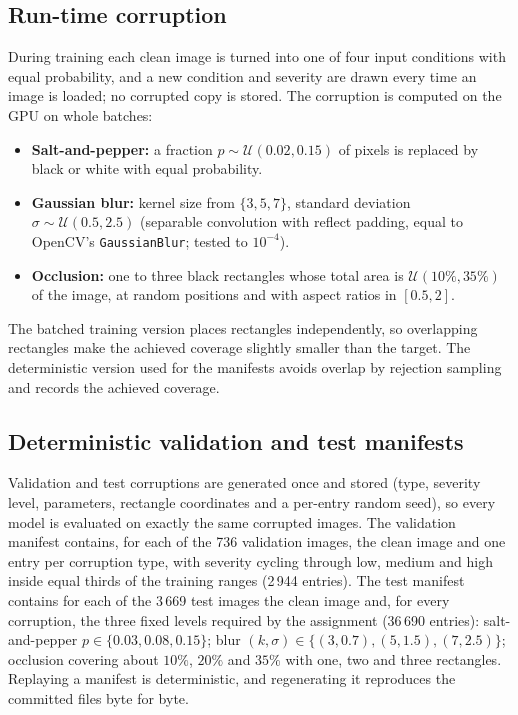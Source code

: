 \documentclass[conference]{IEEEtran}
\begin{document}
\subsection{Run-time corruption}
During training each clean image is turned into one of four input conditions with equal probability, and a new condition and severity are drawn every time an image is loaded;
no corrupted copy is stored. The corruption is computed on the GPU on whole batches:
\begin{itemize}
\item \textbf{Salt-and-pepper:} a fraction $p\sim\mathcal{U}(0.02,0.15)$ of pixels is replaced by black or white with equal probability.
\item \textbf{Gaussian blur:} kernel size from $\{3,5,7\}$, standard deviation $\sigma\sim\mathcal{U}(0.5,2.5)$ (separable convolution with reflect padding, equal to OpenCV's \texttt{GaussianBlur}; tested to $10^{-4}$).
\item \textbf{Occlusion:} one to three black rectangles whose total area is $\mathcal{U}(10\%,35\%)$ of the image, at random positions and with aspect ratios in $[0.5,2]$.
\end{itemize}
The batched training version places rectangles independently, so overlapping rectangles make the achieved coverage slightly smaller than the target. The deterministic version used for the
manifests avoids overlap by rejection sampling and records the achieved coverage.

\subsection{Deterministic validation and test manifests}
Validation and test corruptions are generated once and stored (type, severity level, parameters, rectangle coordinates and a per-entry random seed), so every model is evaluated on exactly the same
corrupted images. The validation manifest contains, for each of the 736 validation images, the clean image and one entry per corruption type, with severity cycling through low, medium and high
inside equal thirds of the training ranges (2\,944 entries). The test manifest contains for each of the 3\,669 test images the clean image and, for every corruption, the three fixed levels required by the assignment
(36\,690 entries): salt-and-pepper $p\in\{0.03,0.08,0.15\}$; blur $(k,\sigma)\in\{(3,0.7),(5,1.5),(7,2.5)\}$; occlusion covering about $10\%$, $20\%$ and $35\%$ with one, two and three rectangles.
Replaying a manifest is deterministic, and regenerating it reproduces the committed files byte for byte.
\end{document}
